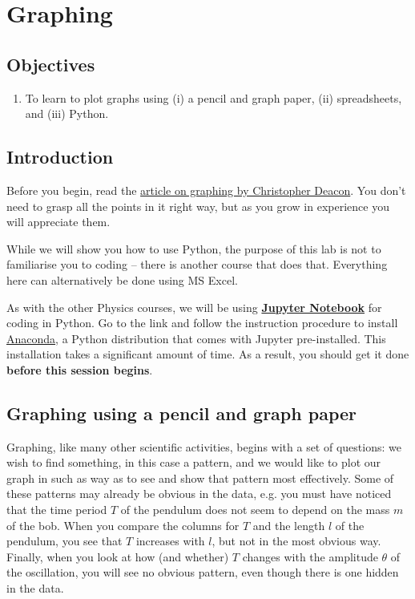 
\chapter{Graphing}
\section{Objectives}

\begin{enumerate}
    \item To learn to plot graphs using (i) a pencil and graph paper, (ii) spreadsheets, and (iii) Python.
\end{enumerate}

\section{Introduction}

Before you begin, read the \href{https://drive.google.com/open?id=1ZxYayhCt-y0VdKSYUTYUvRuKX6yZgWdD}{article on graphing by Christopher Deacon}. You don't need to grasp all the points in it right way, but as you grow in experience you will appreciate them.

While we will show you how to use Python, the purpose of this lab is not to familiarise you to coding -- there is another course that does that. Everything here can alternatively be done using MS Excel.

\begin{imp}
As with the other Physics courses, we will be using \textbf{\href{https://jupyter.org}{Jupyter Notebook}} for coding in Python.  Go to the link and follow the instruction procedure to install \href{https://www.anaconda.com/downloads}{Anaconda}, a Python distribution that comes with Jupyter pre-installed. This installation takes a significant amount of time. As a result, you should get it done \textbf{before this session begins}. 
\end{imp}

\section{Graphing using a pencil and graph paper}
Graphing, like many other scientific activities, begins with a set of questions: we wish to find something, in this case a pattern, and we would like to plot our graph in such as way as to see and show that pattern most effectively. Some of these patterns may already be obvious in the data, e.g. you must have noticed that the time period $T$ of the pendulum does not seem to depend on the mass $m$ of the bob. When you compare the columns for $T$ and the length $l$ of the pendulum, you see that $T$ increases with $l$, but not in the most obvious way. Finally, when you look at how (and whether) $T$ changes with the amplitude $\theta$ of the oscillation, you will see no obvious pattern, even though there is one hidden in the data. 

